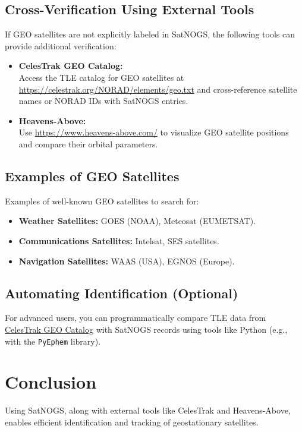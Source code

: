 \subsection{Cross-Verification Using External Tools}
If GEO satellites are not explicitly labeled in SatNOGS, the following tools can provide additional verification:
\begin{itemize}
    \item \textbf{CelesTrak GEO Catalog:} \\
    Access the TLE catalog for GEO satellites at \href{https://celestrak.org/NORAD/elements/geo.txt}{https://celestrak.org/NORAD/elements/geo.txt} and cross-reference satellite names or NORAD IDs with SatNOGS entries.
    \item \textbf{Heavens-Above:} \\
    Use \href{https://www.heavens-above.com/}{https://www.heavens-above.com/} to visualize GEO satellite positions and compare their orbital parameters.
\end{itemize}

\subsection{Examples of GEO Satellites}
Examples of well-known GEO satellites to search for:
\begin{itemize}
    \item \textbf{Weather Satellites:} GOES (NOAA), Meteosat (EUMETSAT).
    \item \textbf{Communications Satellites:} Intelsat, SES satellites.
    \item \textbf{Navigation Satellites:} WAAS (USA), EGNOS (Europe).
\end{itemize}

\subsection{Automating Identification (Optional)}
For advanced users, you can programmatically compare TLE data from \href{https://celestrak.org/NORAD/elements/geo.txt}{CelesTrak GEO Catalog} with SatNOGS records using tools like Python (e.g., with the \texttt{PyEphem} library).

\section{Conclusion}
Using SatNOGS, along with external tools like CelesTrak and Heavens-Above, enables efficient identification and tracking of geostationary satellites.

\endinput  %
